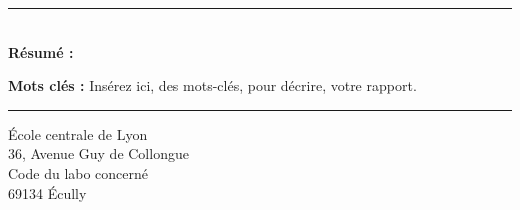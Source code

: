 \documentclass[a4paper,12pt,french]{article}
\begin{document}
%
%



\newpage
\thispagestyle{empty}

\vspace*{\fill}
\noindent\rule[2pt]{\textwidth}{0.5pt}\\
{\textbf{Résumé :}}
\lipsum[1]

{\noindent\textbf{Mots clés :}}
Insérez ici, des mots-clés, pour décrire, votre rapport.
\\
\noindent\rule[2pt]{\textwidth}{0.5pt}
\begin{center}
  École centrale de Lyon\\
  36, Avenue Guy de Collongue\\
  Code du labo concerné\\
  69134 Écully
\end{center}
\vspace*{\fill}
\end{document}
